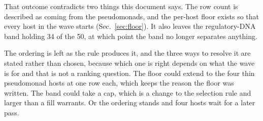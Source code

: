 That outcome contradicts two things this document says. The row count is described as coming
from the pseudomonads, and the per-host floor exists so that every host in the wave starts
(Sec.~\ref{sec:floor}). It also leaves the regulatory-DNA band holding 34 of the 50, at which
point the band no longer separates anything.

The ordering is left as the rule produces it, and the three ways to resolve it are stated rather
than chosen, because which one is right depends on what the wave is for and that is not a
ranking question. The floor could extend to the four thin pseudomonad hosts at one row each,
which keeps the reason the floor was written. The band could take a cap, which is a change to
the selection rule and larger than a fill warrants. Or the ordering stands and four hosts wait
for a later pass.
